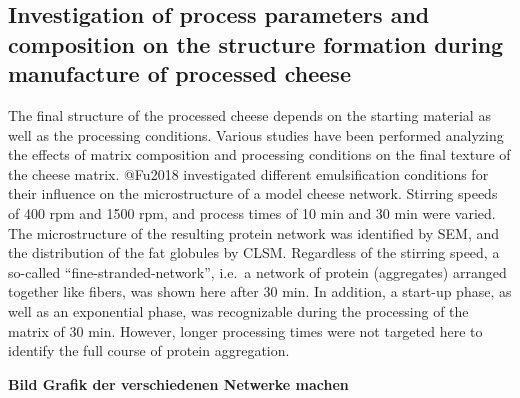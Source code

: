 \documentclass[
]{article}
\begin{document}
\subsection{Investigation of process parameters and composition on the structure formation during manufacture of processed cheese}

The final structure of the processed cheese depends on the starting
material as well as the processing conditions. Various studies have been
performed analyzing the effects of matrix composition and processing
conditions on the final texture of the cheese matrix. @Fu2018
investigated different emulsification conditions for their influence on
the microstructure of a model cheese network. Stirring speeds of 400 rpm
and 1500 rpm, and process times of 10 min and 30 min were varied. The
microstructure of the resulting protein network was identified by SEM,
and the distribution of the fat globules by CLSM. Regardless of the
stirring speed, a so-called ``fine-stranded-network'', i.e.~a network of
protein (aggregates) arranged together like fibers, was shown here after
30 min. In addition, a start-up phase, as well as an exponential phase,
was recognizable during the processing of the matrix of 30 min. However,
longer processing times were not targeted here to identify the full
course of protein aggregation.

\textbf{Bild Grafik der verschiedenen Netwerke machen}
\end{document}

